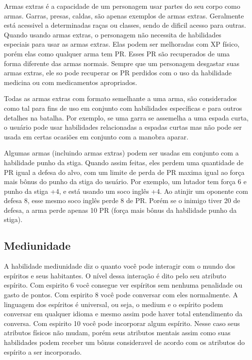 Armas extras é a capacidade de um personagem usar partes do seu corpo como armas. Garras, presas, caldas, são apenas exemplos de armas extras. Geralmente está acessivel a determinadas raças ou classes, sendo de dificil acesso para outras. Quando usando armas extras, o personagem não necessita de habilidades especiais para usar as armas extras. Elas podem ser melhoradas com XP físico, porém elas como qualquer arma tem PR. Esses PR são recuperados de uma forma diferente das armas normais. Sempre que um personagem desgastar suas armas extras, ele so pode recuperar os PR perdidos com o uso da habilidade medicina ou com medicamentos apropriados.

Todas as armas extras com formato semelhante a uma arma, são considerados como tal para fins de uso em conjunto com habilidades específicas e para outros detalhes na batalha. Por exemplo, se uma garra se assemelha a uma espada curta, o usuário pode usar habilidades relacionadas a espadas curtas mas não pode ser usada em certas ocasiões em conjunto com a manobra aparar.
 
Algumas armas (incluindo armas extras) podem ser usadas em conjunto com a habilidade punho da stiga. Quando assim feitas, eles perdem uma quantidade de PR igual a defesa do alvo, com um limite de perda de PR maxima igual ao força mais bônus do punho da stiga do usuário. Por exemplo, um lutador tem força 6 e punho da stiga +4, e está usando um soco inglês +4. Ao atinjir um oponente com defesa 8, esse mesmo soco inglês perde 8 de PR. Porém se o inimigo tiver 20 de defesa, a arma perde apenas 10 PR (força mais bônus da habilidade punho da stiga).

\subsection{Mediunidade}
 
 A habilidade mediunidade diz o quanto você pode interagir com o mundo dos espíritos e seus habitantes. O nível dessa interação é dito pelo seu atributo espírito. Com espirito 6 você consegue ver espíritos sem nenhuma penalidade ou gasto de pontos. Com espirito 8 você pode conversar com eles normalmente. A linguagem dos espíritos é universal, ou seja, o medium e o espírito podem conversar em qualquer idioma e mesmo assim pode haver total entendimento da conversa. Com espirito 10 você pode incorporar algum espírito. Nesse caso seus atributos físicos não mudam, porém seus atributos mentais assim como suas habilidades podem receber um bônus consideravel de acordo com os atributos do espírito a ser incorporado.
 
